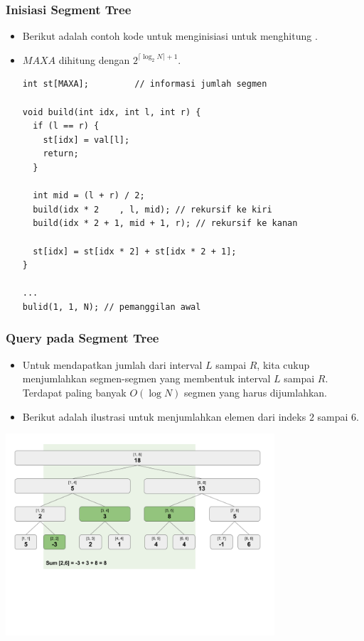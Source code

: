 \begin{frame}[fragile]
\frametitle{Inisiasi Segment Tree}
\begin{itemize}
  \item Berikut adalah contoh kode untuk menginisiasi \fsegmentTree untuk menghitung \frangeSumQuery.
  \item $MAXA$ dihitung dengan $2^{\lceil \log_{2}N \rceil + 1}$.
\begin{lstlisting}
int st[MAXA];         // informasi jumlah segmen

void build(int idx, int l, int r) {
  if (l == r) {
    st[idx] = val[l];
    return;
  }

  int mid = (l + r) / 2;
  build(idx * 2    , l, mid); // rekursif ke kiri
  build(idx * 2 + 1, mid + 1, r); // rekursif ke kanan
  
  st[idx] = st[idx * 2] + st[idx * 2 + 1];
}

...
bulid(1, 1, N); // pemanggilan awal
\end{lstlisting}
\end{itemize}
\end{frame}

\begin{frame}
\frametitle{Query pada Segment Tree}
\begin{itemize}
  \item Untuk mendapatkan jumlah dari interval $L$ sampai $R$, kita cukup menjumlahkan segmen-segmen yang membentuk interval $L$ sampai $R$. Terdapat paling banyak $O(\log N)$ segmen yang harus dijumlahkan.
  \item Berikut adalah ilustrasi untuk menjumlahkan elemen dari indeks $2$ sampai $6$.
\end{itemize}
\begin{center}
  \includegraphics[width=10cm]{asset/segtree-sum.png}
\end{center}
\end{frame}

